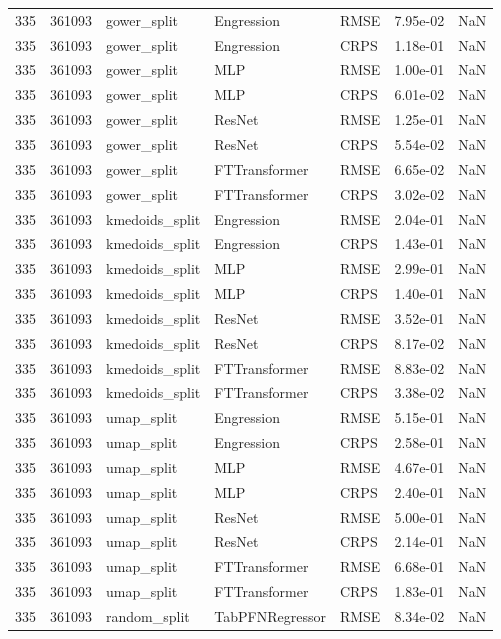 \begin{tabular}{rrlllrr}
335 & 361093 & gower\_split & Engression & RMSE & 7.95e-02 & NaN \\
335 & 361093 & gower\_split & Engression & CRPS & 1.18e-01 & NaN \\
335 & 361093 & gower\_split & MLP & RMSE & 1.00e-01 & NaN \\
335 & 361093 & gower\_split & MLP & CRPS & 6.01e-02 & NaN \\
335 & 361093 & gower\_split & ResNet & RMSE & 1.25e-01 & NaN \\
335 & 361093 & gower\_split & ResNet & CRPS & 5.54e-02 & NaN \\
335 & 361093 & gower\_split & FTTransformer & RMSE & 6.65e-02 & NaN \\
335 & 361093 & gower\_split & FTTransformer & CRPS & 3.02e-02 & NaN \\
335 & 361093 & kmedoids\_split & Engression & RMSE & 2.04e-01 & NaN \\
335 & 361093 & kmedoids\_split & Engression & CRPS & 1.43e-01 & NaN \\
335 & 361093 & kmedoids\_split & MLP & RMSE & 2.99e-01 & NaN \\
335 & 361093 & kmedoids\_split & MLP & CRPS & 1.40e-01 & NaN \\
335 & 361093 & kmedoids\_split & ResNet & RMSE & 3.52e-01 & NaN \\
335 & 361093 & kmedoids\_split & ResNet & CRPS & 8.17e-02 & NaN \\
335 & 361093 & kmedoids\_split & FTTransformer & RMSE & 8.83e-02 & NaN \\
335 & 361093 & kmedoids\_split & FTTransformer & CRPS & 3.38e-02 & NaN \\
335 & 361093 & umap\_split & Engression & RMSE & 5.15e-01 & NaN \\
335 & 361093 & umap\_split & Engression & CRPS & 2.58e-01 & NaN \\
335 & 361093 & umap\_split & MLP & RMSE & 4.67e-01 & NaN \\
335 & 361093 & umap\_split & MLP & CRPS & 2.40e-01 & NaN \\
335 & 361093 & umap\_split & ResNet & RMSE & 5.00e-01 & NaN \\
335 & 361093 & umap\_split & ResNet & CRPS & 2.14e-01 & NaN \\
335 & 361093 & umap\_split & FTTransformer & RMSE & 6.68e-01 & NaN \\
335 & 361093 & umap\_split & FTTransformer & CRPS & 1.83e-01 & NaN \\
335 & 361093 & random\_split & TabPFNRegressor & RMSE & 8.34e-02 & NaN \\

\end{tabular}
